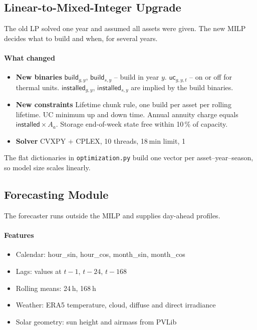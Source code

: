 \subsection{Linear-to-Mixed-Integer Upgrade}

The old LP solved one year and assumed all assets were given.  
The new MILP decides what to build and when, for several years.

\paragraph{What changed}

\begin{itemize}
\item \textbf{New binaries}  
      \(\textsf{build}_{g,y}\), \(\textsf{build}_{s,y}\) – build in year \(y\).  
      \(\textsf{uc}_{g,y,t}\) – on or off for thermal units.  
      \(\textsf{installed}_{g,y}\), \(\textsf{installed}_{s,y}\) are implied by
      the build binaries.  
\item \textbf{New constraints}  
      Lifetime chunk rule, one build per asset per rolling lifetime.  
      UC minimum up and down time.  
      Annual annuity charge equals \(\textsf{installed}\times A_a\).  
      Storage end-of-week state free within 10\,\% of capacity.  
\item \textbf{Solver}  
      CVXPY \(+\) CPLEX, 10 threads, 18 min limit, 1 %
\end{itemize}

The flat dictionaries in \texttt{optimization.py} build one vector per
asset–year–season, so model size scales linearly.

\subsection{Forecasting Module}

The forecaster runs outside the MILP and supplies day-ahead profiles.

\paragraph{Features}

\begin{itemize}
\item Calendar: hour\_sin, hour\_cos, month\_sin, month\_cos  
\item Lags: values at \(t-1\), \(t-24\), \(t-168\)  
\item Rolling means: 24 h, 168 h  
\item Weather: ERA5 temperature, cloud, diffuse and direct irradiance  
\item Solar geometry: sun height and airmass from PVLib  
\end{itemize}


